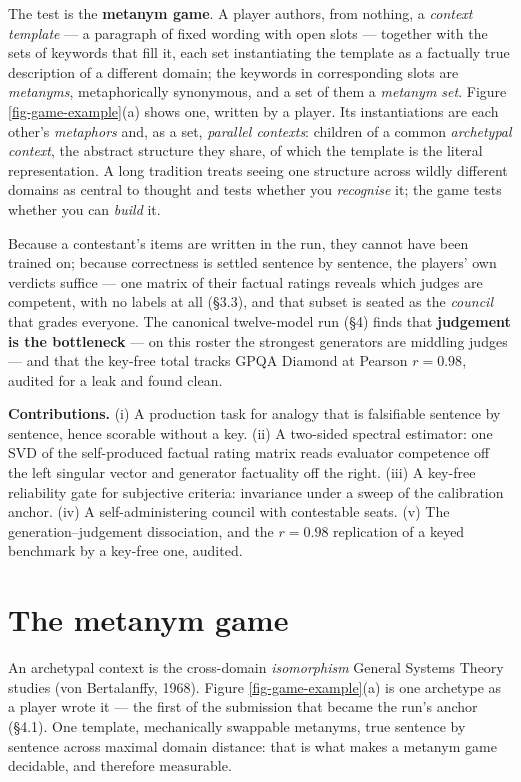 \documentclass{article}
\begin{document}
The test is the \textbf{metanym game}. A player authors, from nothing, a \emph{context template} --- a paragraph of fixed wording with open slots --- together with the sets of keywords that fill it, each set instantiating the template as a factually true description of a different domain; the keywords in corresponding slots are \emph{metanyms}, metaphorically synonymous, and a set of them a \emph{metanym set}. Figure \ref{fig-game-example}(a) shows one, written by a player. Its instantiations are each other's \emph{metaphors} and, as a set, \emph{parallel contexts}: children of a common \emph{archetypal context}, the abstract structure they share, of which the template is the literal representation. A long tradition treats seeing one structure across wildly different domains as central to thought and tests whether you \emph{recognise} it; the game tests whether you can \emph{build} it.

Because a contestant's items are written in the run, they cannot have been trained on; because correctness is settled sentence by sentence, the players' own verdicts suffice --- one matrix of their factual ratings reveals which judges are competent, with no labels at all (\S{}3.3), and that subset is seated as the \emph{council} that grades everyone. The canonical twelve-model run (\S{}4) finds that \textbf{judgement is the bottleneck} --- on this roster the strongest generators are middling judges --- and that the key-free total tracks GPQA Diamond at Pearson \(r = 0.98\), audited for a leak and found clean.

\textbf{Contributions.} (i) A production task for analogy that is falsifiable sentence by sentence, hence scorable without a key. (ii) A two-sided spectral estimator: one SVD of the self-produced factual rating matrix reads evaluator competence off the left singular vector and generator factuality off the right. (iii) A key-free reliability gate for subjective criteria: invariance under a sweep of the calibration anchor. (iv) A self-administering council with contestable seats. (v) The generation--judgement dissociation, and the \(r = 0.98\) replication of a keyed benchmark by a key-free one, audited.

\section{The metanym game}\label{the-metanym-game}

An archetypal context is the cross-domain \emph{isomorphism} General Systems Theory studies (von Bertalanffy, 1968). Figure \ref{fig-game-example}(a) is one archetype as a player wrote it --- the first of the submission that became the run's anchor (\S{}4.1). One template, mechanically swappable metanyms, true sentence by sentence across maximal domain distance: that is what makes a metanym game decidable, and therefore measurable.
\end{document}
